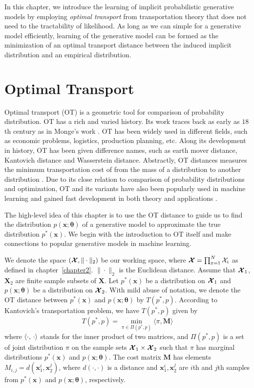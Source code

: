 In this chapter, we introduce the learning of implicit probabilistic generative models by employing \textit{optimal transport} from transportation theory that does not need to the tractability of likelihood. As long as we can simple for a generative model efficiently, learning of the generative model can be formed as the minimization of an optimal transport distance between the induced implicit distribution and an empirical distribution.

\section{Optimal Transport}
Optimal transport (OT) is a geometric tool for comparison of probability distribution. OT has a rich and varied history. Its work traces back as early as $18$th century as in Monge's work \cite{monge1781memoire}. OT has been widely used in different fields, such as economic problems, logistics, production planning, etc. Along its development in history, OT has been given difference names, such as earth mover distance, Kantovich distance
and Wasserstein distance. Abstractly, OT distances measures the minimum transportation cost of from the mass of a distribution to another distribution \cite{villani2003topics}. Due to its close relation to comparison of probability distributions and optimization, OT and its
variants have also been popularly used in machine learning and gained fast development in both theory and applications \cite{2013arXiv1310.4375C, 2013arXiv1306.0895C, 2016arXiv161006519S, DBLP:conf/icml/ClaiciCS18}.

The high-level idea of this chapter is to use the OT distance to guide us to find the distribution $p(\bm{x}; \bm{\theta})$ of a generative model to approximate the true distribution $p^{\ast}(\bm{x})$. We begin with the introduction to OT itself and make connections to popular generative models in machine learning.

We denote the space $(\bm{\mathcal{X}},\|\cdot\|_2)$ be our working space, where $\bm{\mathcal{X}} = \prod_{x=1}^{N} \mathcal{X}_i$ as defined in chapter~\ref{chapter2}. $\|\cdot\|_2$ is the Euclidean distance. Assume that $\bm{\mathcal{X}}_1$, $\bm{X}_2$ are finite sample subsets of $\bm{X}$. Let $p^{\ast}(\bm{x})$ be a distribution on $\bm{\mathcal{X}}_1$ and $p(\bm{x};\bm{\theta})$ be a distribution on $\bm{\mathcal{X}}_2$.
With mild abuse of notation, we denote the OT distance between $p^{\ast}(\bm{x})$ and $p(\bm{x}; \bm{\theta})$ by $T(p^{\ast},p)$. According to Kantovich's transportation problem\cite{villani2003topics}, we have $T(p^{\ast},p)$ given by
\begin{equation}\label{chpt8:eq:ot}
  T(p^{\ast}, p) = \min_{\pi\in\Pi(p^{\ast}, p)}\langle\pi,\bm{M}\rangle
\end{equation}
where $\langle \cdot,\,\cdot\rangle$ stands for the inner product of
two matrices, and $\Pi(p^{\ast},p)$ is a set of joint distribution $\pi$ on
the sample sets $\bm{\mathcal{X}}_1\times\bm{\mathcal{X}}_2$ such that $\pi$ has
marginal distributions $p^{\ast}(\bm{x})$ and $p(\bm{x}; \bm{\theta})$. 
The cost matrix $\bm{M}$ has elements $M_{i,j} = d(\bm{x}_1^{i}, \bm{x}_2^{j})$, where $d(\cdot, \cdot)$ is a distance and $\bm{x}_1^{i}, \bm{x}_2^{j}$ are $i$th and $j$th samples from $p^{\ast}(\bm{x})$ and $p(\bm{x}; \bm{\theta})$, respectively. 


